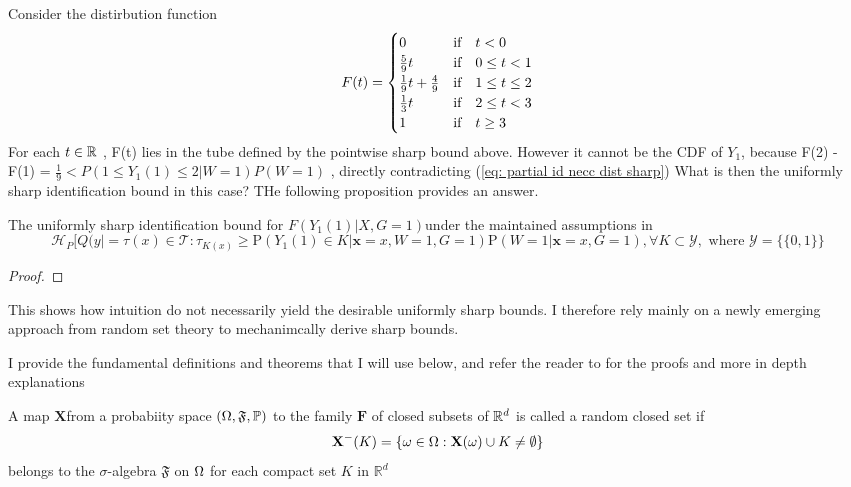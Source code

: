 \documentclass{article}
\begin{document}
Consider the distirbution function 
\begin{align}
    F(t) = \begin{cases}
        0&\text{if}\quad t < 0\\
        \frac{5}{9}t & \text{if}\quad 0 \leq t < 1 \\
        \frac{1}{9}t + \frac{4}{9} & \text{if}\quad  1 \leq t \leq 2\\
        \frac{1}{3}t & \text{if}\quad  2\leq t < 3\\
        1 & \text{if}\quad t \geq 3
    \end{cases}
\end{align}
For each $t \in\mathbb{R}$ , F(t)  lies in the tube defined by the pointwise sharp bound above. However it cannot be the CDF of $ Y_1$, because F(2) - F(1) = $ \frac{1}{9}< P (1 \leq Y_1(1) \leq 2 | W=1) P( W=1)  $ , directly contradicting (\ref{eq: partial id necc dist sharp})
What is then the uniformly sharp identification bound in this case? THe following proposition provides an answer.
\begin{proposition}
    The uniformly sharp identification bound for $ F(Y_1(1) |  X, G=1)$under the maintained assumptions in \cite{athey2020combining} 
    \begin{equation}
        \mathcal{H}_P[ Q(y |   =  \tau(x) \in \mathcal{T} : \tau_{K(x) }\geq \mathrm{P}( Y_1(1) \in K | \mathbf{x}=x, W=1,G=1) \mathrm{P}(W =1 | \mathbf{x} = x, G=1) , \forall K \subset \mathcal{Y} , \text{ where }\mathcal{Y}= \{ \{0,1\} \}
    \end{equation} 
\end{proposition}
\begin{proof}
    
\end{proof}


This shows how intuition do not necessarily yield the desirable uniformly sharp bounds. I therefore rely mainly on a newly emerging approach from random set theory\cite{molchanov2005theory} to mechanimcally derive sharp bounds. 


I provide the fundamental definitions and theorems that I will use below, and refer the reader to \cite{molchanov2005theory,molchanov2018random} for the proofs and more in depth explanations
\begin{definition}
    A map $\mathbf{X} $from a probabiity space $( \Omega,\mathfrak{F},\mathbb{P} ) $ to the family $\mathbf{F} $ of closed subsets of $ \mathbb{R}^d $ is called a random closed set if 
    \begin{equation}
        \mathbf{ X}^-(K) = \{ \omega \in \Omega : \mathbf{X} (\omega) \cup K \neq \emptyset \}     
    \end{equation}
    belongs to the $\sigma $-algebra $\mathfrak{F} $ on $\Omega$ for each compact set $K$ in $\mathbb{R}^d$
\end{definition}
\end{document}
